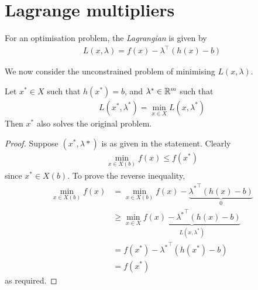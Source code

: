 \documentclass{../template/note}
\begin{document}
    \section{Lagrange multipliers}

    \begin{definition}[Lagragian]
        For an optimisation problem, the \emph{Lagrangian} is given by
        \begin{align*}
            L(x, \lambda) = f(x) - \lambda^\intercal (h(x)-b)
        \end{align*}
    \end{definition}
    
    We now consider the unconstrained problem of minimising $L(x, \lambda)$.

    \begin{theorem}
        Let $x^* \in X$ such that $h(x^*)=b$, and $\lambda^* \in \mathbb R^m$ such that
        \begin{align*}
            L(x^*, \lambda^*) = \min_{x \in X} L(x, \lambda^*)
        \end{align*}
        Then $x^*$ also solves the original problem.        
    \end{theorem}
    
    \begin{proof}
        Suppose $(x^*, \lambda*)$ is as given in the statement. Clearly
        \begin{align*}
            \min_{x \in X(b)} f(x) \leq f(x^*)
        \end{align*}
        since $x^* \in X(b)$. To prove the reverse inequality,
        \begin{align*}
            \min_{x \in X(b)} f(x) &= \min_{x \in X(b)} f(x) - \underbrace{{\lambda^*}^\intercal (h(x)-b)}_0 \\
            &\geq \min_{x \in X} \underbrace{f(x) - {\lambda^*}^\intercal (h(x)-b)}_{L(x, \lambda^*)} \\
            &= f(x^*) - {\lambda^*}^\intercal (h(x^*)-b) \\
            &= f(x^*)
        \end{align*}
        as required.
    \end{proof}
    
\end{document}

